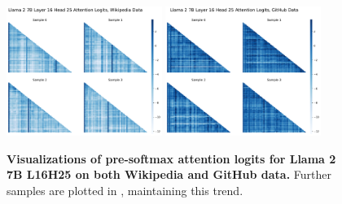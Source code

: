 \begin{figure}
    \centering
    \includegraphics[width=0.45\textwidth]{Figures/L16_H25/attn_logits_l16h25_wiki_small.pdf}
    \hspace{0.075\textwidth}
    \includegraphics[width=0.45\textwidth]{Figures/L16_H25/attn_logits_l16h25_github_small.pdf}
    \caption{\small\textbf{Visualizations of pre-softmax attention logits for Llama 2 7B L16H25 on both Wikipedia and GitHub data.}  Further samples are plotted in , maintaining this trend. }
    \label{fig:attn_logits_l16_h25_small}
\end{figure}

